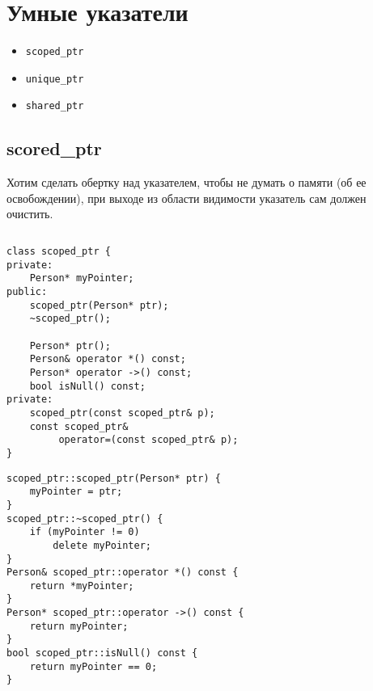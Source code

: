 \section{Умные указатели}
\begin{itemize}[noitemsep]
    \item \begin{verbatim}scoped_ptr \end{verbatim}
    \item \begin{verbatim}unique_ptr \end{verbatim}
    \item \begin{verbatim}shared_ptr \end{verbatim}
\end{itemize}
\subsection{scored\_ptr}
Хотим сделать обертку над указателем, чтобы не думать о памяти (об ее освобождении), при выходе из области видимости указатель сам должен очистить.

$ $

\begin{minipage}{0.45\textwidth}
\begin{verbatim}
class scoped_ptr {
private:
    Person* myPointer;
public:
    scoped_ptr(Person* ptr);
    ~scoped_ptr();

    Person* ptr();
    Person& operator *() const;
    Person* operator ->() const;
    bool isNull() const;
private:
    scoped_ptr(const scoped_ptr& p);
    const scoped_ptr& 
         operator=(const scoped_ptr& p);
}
\end{verbatim}
\end{minipage}
\hfill
\begin{minipage}{0.45\textwidth}
\begin{verbatim}
scoped_ptr::scoped_ptr(Person* ptr) {
    myPointer = ptr;
}
scoped_ptr::~scoped_ptr() {
    if (myPointer != 0) 
        delete myPointer;
}
Person& scoped_ptr::operator *() const {
    return *myPointer;
}
Person* scoped_ptr::operator ->() const {
    return myPointer;
}
bool scoped_ptr::isNull() const {
    return myPointer == 0;
}
\end{verbatim}
\end{minipage}

